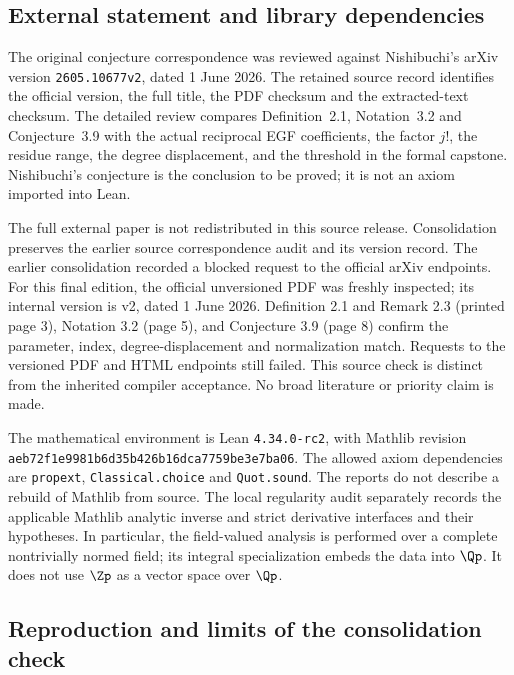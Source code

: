 \subsection{External statement and library dependencies}

The original conjecture correspondence was reviewed against Nishibuchi's
arXiv version \texttt{2605.10677v2}, dated 1 June 2026. The retained source
record identifies the official version, the full title, the PDF checksum and
the extracted-text checksum. The detailed review compares Definition~2.1,
Notation~3.2 and Conjecture~3.9 with the actual reciprocal EGF coefficients,
the factor $j!$, the residue range, the degree displacement, and the threshold
in the formal capstone. Nishibuchi's conjecture is the conclusion to be
proved; it is not an axiom imported into Lean.

The full external paper is not redistributed in this source release.
Consolidation preserves the earlier source correspondence audit and its
version record. The earlier consolidation recorded a blocked request to the official arXiv endpoints.
For this final edition, the official unversioned PDF was freshly inspected;
its internal version is v2, dated 1 June 2026. Definition 2.1 and Remark 2.3
(printed page 3), Notation 3.2 (page 5), and Conjecture 3.9 (page 8)
confirm the parameter, index, degree-displacement and normalization match.
Requests to the versioned PDF and HTML endpoints still failed.
This source check is distinct from the inherited compiler acceptance.
No broad literature or priority claim is made.

The mathematical environment is Lean \texttt{4.34.0-rc2}, with Mathlib revision
\nolinkurl{aeb72f1e9981b6d35b426b16dca7759be3e7ba06}.
The allowed axiom dependencies are
\texttt{propext}, \texttt{Classical.choice} and \texttt{Quot.sound}.
The reports do not describe a rebuild of Mathlib from source. The local
regularity audit separately records the applicable Mathlib analytic inverse
and strict derivative interfaces and their hypotheses. In particular, the
field-valued analysis is performed over a complete nontrivially normed field;
its integral specialization embeds the data into $\Qp$. It does not use
$\Zp$ as a vector space over $\Qp$.

\subsection{Reproduction and limits of the consolidation check}

